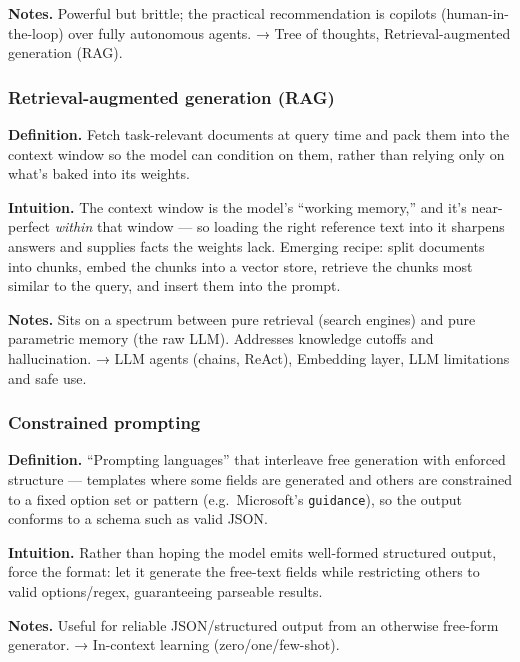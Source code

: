 \documentclass[
  10pt,
  letterpaper,
  onecolumn]{article}
\begin{document}
\textbf{Notes.} Powerful but brittle; the practical recommendation is
copilots (human-in-the-loop) over fully autonomous agents. → Tree of
thoughts, Retrieval-augmented generation (RAG).

\hypertarget{retrieval-augmented-generation-rag}{%
\subsubsection{Retrieval-augmented generation
(RAG)}\label{retrieval-augmented-generation-rag}}

\textbf{Definition.} Fetch task-relevant documents at query time and
pack them into the context window so the model can condition on them,
rather than relying only on what's baked into its weights.

\textbf{Intuition.} The context window is the model's ``working
memory,'' and it's near-perfect \emph{within} that window --- so loading
the right reference text into it sharpens answers and supplies facts the
weights lack. Emerging recipe: split documents into chunks, embed the
chunks into a vector store, retrieve the chunks most similar to the
query, and insert them into the prompt.

\textbf{Notes.} Sits on a spectrum between pure retrieval (search
engines) and pure parametric memory (the raw LLM). Addresses knowledge
cutoffs and hallucination. → LLM agents (chains, ReAct), Embedding
layer, LLM limitations and safe use.

\hypertarget{constrained-prompting}{%
\subsubsection{Constrained prompting}\label{constrained-prompting}}

\textbf{Definition.} ``Prompting languages'' that interleave free
generation with enforced structure --- templates where some fields are
generated and others are constrained to a fixed option set or pattern
(e.g.~Microsoft's \texttt{guidance}), so the output conforms to a schema
such as valid JSON.

\textbf{Intuition.} Rather than hoping the model emits well-formed
structured output, force the format: let it generate the free-text
fields while restricting others to valid options/regex, guaranteeing
parseable results.

\textbf{Notes.} Useful for reliable JSON/structured output from an
otherwise free-form generator. → In-context learning
(zero/one/few-shot).
\end{document}
